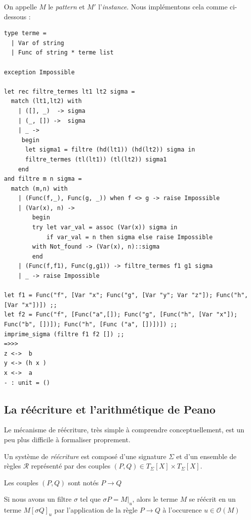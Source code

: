 On appelle $M$ le \textit{pattern} et $M'$ l'\textit{instance}.
Nous implémentons cela comme ci-dessous :
\begin{verbatim}
type terme = 
  | Var of string
  | Func of string * terme list

exception Impossible

let rec filtre_termes lt1 lt2 sigma =
  match (lt1,lt2) with
    | ([], _)  -> sigma
    | (_, []) ->  sigma
    | _ -> 
     begin
	  let sigma1 = filtre (hd(lt1)) (hd(lt2)) sigma in
	  filtre_termes (tl(lt1)) (tl(lt2)) sigma1
    end 
and filtre m n sigma =
  match (m,n) with
	| (Func(f,_), Func(g, _)) when f <> g -> raise Impossible
	| (Var(x), n) -> 
		begin
		try let var_val = assoc (Var(x)) sigma in
			if var_val = n then sigma else raise Impossible
		with Not_found -> (Var(x), n)::sigma
		end 
	| (Func(f,f1), Func(g,g1)) -> filtre_termes f1 g1 sigma 
	| _ -> raise Impossible

let f1 = Func("f", [Var "x"; Func("g", [Var "y"; Var "z"]); Func("h", [Var "x"])]) ;;
let f2 = Func("f", [Func("a",[]); Func("g", [Func("h", [Var "x"]); Func("b", [])]); Func("h", [Func ("a", [])])]) ;;
imprime_sigma (filtre f1 f2 []) ;;
=>>>
z <->  b 
y <-> (h x )
x <->  a 
- : unit = ()
\end{verbatim}

\subsection{La réécriture et l'arithmétique de Peano}
Le mécanisme de réécriture, très simple à comprendre conceptuellement, est un peu plus difficile
à formaliser proprement.

Un système de \textit{réécriture} est  composé d'une signature $\Sigma$ et d'un ensemble de règles
$\mathcal{R}$ représenté par des couples $(P,Q) \in T_\Sigma [X] \times  T_\Sigma [X]$.

Les couples $(P,Q)$ sont notés $P \longrightarrow Q$

Si nous avons un filtre $\sigma$ tel que $\sigma P = M|_u$, alors le terme $M$ se 
réécrit en un terme $M[\sigma Q]_u$ par l'application de la règle $P \longrightarrow Q$ 
à l'occurence $u \in \mathcal{O}(M)$  
\begin{center}
\end{center}

